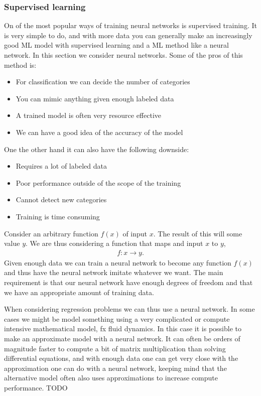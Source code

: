 \documentclass[12pt,a4paper]{article} %
\numberwithin{equation}{section}
\begin{document}
		\subsubsection{Supervised learning}
			On of the most popular ways of training neural networks is supervised training. It is very simple to do, and with more data you can generally make an increasingly good ML model with supervised learning and a ML method like a neural network. In this section we consider neural networks. Some of the pros of this method is: 
			\begin{itemize}
				\item For classification we can decide the number of categories
				\item You can mimic anything given enough labeled data
				\item A trained model is often very resource effective
				\item We can have a good idea of the accuracy of the model
			\end{itemize}
			One the other hand it can also have the following downside:
			\begin{itemize}
				\item Requires a lot of labeled data
				\item Poor performance outside of the scope of the training
				\item Cannot detect new categories
				\item Training is time consuming
			\end{itemize}			
			Consider an arbitrary function $f(x)$ of input $x$. The result of this will some value $y$. We are thus considering a function that maps and input $x$ to $y$,
			\begin{gather}
				f: x \rightarrow y.
			\end{gather}
			Given enough data we can train a neural network to become any function $f(x)$ and thus have the neural network imitate whatever we want. The main requirement is that our neural network have enough degrees of freedom and that we have an appropriate amount of training data. 
			
			When considering regression problems we can thus use a neural network. In some cases we might be model something using a very complicated or compute intensive mathematical model, fx fluid dynamics. In this case it is possible to make an approximate model with a neural network. It can often be orders of magnitude faster to compute a bit of matrix multiplication than solving differential equations, and with enough data one can get very close with the approximation one can do with a neural network, keeping mind that the alternative model often also uses approximations to increase compute performance. TODO\cite{}
			
\end{document}
